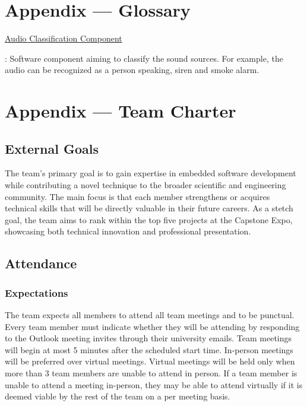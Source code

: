 \documentclass{article}
\begin{document}
\newpage{}

\section*{Appendix --- Glossary}


\hypertarget{audio_classification_component}{\underline{Audio Classification
Component}}: Software component aiming to classify the sound sources. For
example, the audio can be recognized as a person speaking, siren and smoke 
alarm.

\newpage{}

\section*{Appendix --- Team Charter}

\subsection*{External Goals}

The team's primary goal is to gain expertise in embedded software development
while contributing a novel technique to the broader scientific and engineering
community. The main focus is that each member strengthens or acquires technical
skills that will be directly valuable in their future careers. As a stetch goal,
the team aims to rank within the top five projects at the Capstone Expo,
showcasing both technical innovation and professional presentation.

\subsection*{Attendance}

\subsubsection*{Expectations}

The team expects all members to attend all team meetings and to be punctual.
Every team member must indicate whether they will be attending by responding to
the Outlook meeting invites through their university emails. Team meetings will
begin at most 5 minutes after the scheduled start time. In-person meetings will
be preferred over virtual meetings. Virtual meetings will be held only when more
than 3 team members are unable to attend in person. If a team member is unable
to attend a meeting in-person, they may be able to attend virtually if it is
deemed viable by the rest of the team on a per meeting basis.
\end{document}
